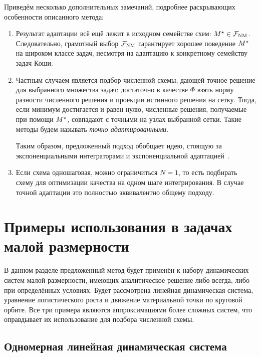 Приведём несколько дополнительных замечаний, подробнее раскрывающих особенности описанного метода:
\begin{enumerate}
    \item
        Результат адаптации всё ещё лежит в исходном семействе схем: $ M^\star \in \mathcal{F}_{\textnormal{NM}} $.
        Следовательно, грамотный выбор $ \mathcal{F}_{\textnormal{NM}} $ гарантирует хорошее поведение $ M^\star $
        на широком классе задач, несмотря на адаптацию к конкретному семейству задач Коши.

    \item
        Частным случаем является подбор численной схемы,
        дающей точное решение для выбранного множества задач:
        достаточно в качестве $ \Phi $ взять норму разности численного решения и проекции истинного решения на сетку.
        Тогда, если минимум достигается и равен нулю,
        численные решения, получаемые при помощи $ M^\star $, совпадают с точными на узлах выбранной сетки.
        Такие методы будем называть \emph{точно адаптированными}.

        Таким образом, предложенный подход обобщает идею, стоящую за экспоненциальными интеграторами
        и экспоненциальной адаптацией~\cite{liniger1970efficient_integration_methods, lambert1991methods, hollevoet2013exponential_fitting}.

    \item
        Если схема одношаговая, можно ограничиться $ N = 1 $,
        то есть подбирать схему для оптимизации качества на одном шаге интегрирования.
        В случае точной адаптации это полностью эквивалентно общему подходу.
\end{enumerate}


\section{Примеры использования в задачах малой размерности}
\label{section:methods:low_dimensional_examples}

В данном разделе предложенный метод будет применён к набору динамических систем малой размерности,
имеющих аналитическое решение либо всегда, либо при определённых условиях.
Будет рассмотрена линейная динамическая система,
уравнение логистического роста и движение материальной точки по круговой орбите.
Все три примера являются аппроксимациями более сложных систем,
что оправдывает их использование для подбора численной схемы.

\subsection{Одномерная линейная динамическая система}
\label{subsection:methods:one_dimensional_linear_system}

